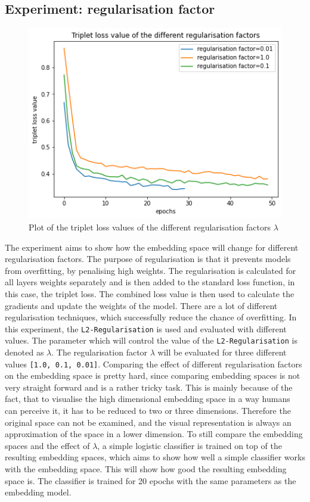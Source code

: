 \subsection{Experiment: regularisation factor}
\label{sub:Experiment-Regularisation-Factor}
\begin{figure}[ht]
\centering
    \includegraphics[width=0.5\linewidth]{study-doc/experiment_regularisation/assets/triplet_loss.png}
    \caption{Plot of the triplet loss values of the different regularisation factors $\lambda$}
    \label{fig:plot-triplet-loss}
\end{figure}
\noindent
The experiment aims to show how the embedding space will change for different regularisation factors. The purpose of regularisation is that it prevents models from overfitting, by penalising high weights. The regularisation is calculated for all layers weights separately and is then added to the standard loss function, in this case, the triplet loss. The combined loss value is then used to calculate the gradients and update the weights of the model. There are a lot of different regularisation techniques, which successfully reduce the chance of overfitting. In this experiment, the \texttt{L2-Regularisation} is used and evaluated with different values. The parameter which will control the value of the \texttt{L2-Regularisation} is denoted as $\lambda$. The regularisation factor $\lambda$ will be evaluated for three different values \texttt{[1.0, 0.1, 0.01]}.
\newline
\newline
Comparing the effect of different regularisation factors on the embedding space is pretty hard, since comparing embedding spaces is not very straight forward and is a rather tricky task. This is mainly because of the fact, that to visualise the high dimensional embedding space in a way humans can perceive it, it has to be reduced to two or three dimensions. Therefore the original space can not be examined, and the visual representation is always an approximation of the space in a lower dimension. To still compare the embedding spaces and the effect of $\lambda$, a simple logistic classifier is trained on top of the resulting embedding spaces, which aims to show how well a simple classifier works with the embedding space. This will show how good the resulting embedding space is. The classifier is trained for 20 epochs with the same parameters as the embedding model.
